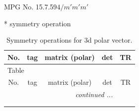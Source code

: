 \documentclass[fleqn,8pt]{jsarticle}
\begin{document}
\setcounter{MaxMatrixCols}{32}

\renewcommand{\tablename}{Table~}
\renewcommand{\figurename}{Figure~}
\begin{center}
\LARGE
MPG No. 15.7.59\quad$4/m'm'm'$
\end{center}
* symmetry operation
\renewcommand{\arraystretch}{1.3}
\begin{longtable}{ccccc}
\caption{Symmetry operations for 3d polar vector.}
 \\
 \hline \hline
No. & tag & matrix (polar) & det & TR \\ \hline \endfirsthead

\multicolumn{4}{l}{\tablename\ \thetable{}} \\
 \hline \hline
No. & tag & matrix (polar) & det & TR \\ \hline \endhead

 \hline \hline
\multicolumn{4}{r}{\footnotesize\it continued ...} \\ \endfoot

 \hline \hline
\multicolumn{4}{r}{} \\ \endlastfoot


\end{longtable}
\end{document}
